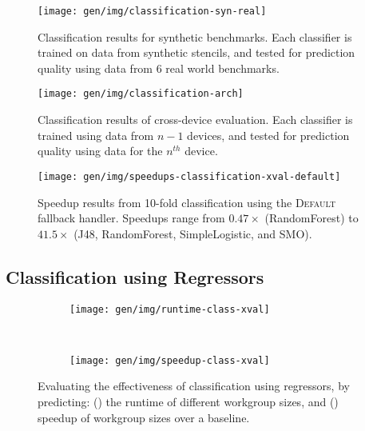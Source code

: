 

\cleardoublepage
\begin{figure}
\centering
\texttt{[image: gen/img/classification-syn-real]}
\caption{%
  Classification results for synthetic benchmarks. Each classifier is
  trained on data from synthetic stencils, and tested for prediction
  quality using data from 6 real world benchmarks.%
}
\end{figure}
\newpage
\begin{figure}
\centering
\texttt{[image: gen/img/classification-arch]}
\caption{%
  Classification results of cross-device evaluation. Each classifier
  is trained using data from $n-1$ devices, and tested for prediction
  quality using data for the $n^{th}$ device.%
}
\end{figure}

\begin{figure}
\centering
\texttt{[image: gen/img/speedups-classification-xval-default]}
\caption{%
  Speedup results from 10-fold classification using the
  \textsc{Default} fallback handler. Speedups range from $0.47\times$
  (RandomForest) to $41.5\times$ (J48, RandomForest, SimpleLogistic,
  and SMO).%
}
\end{figure}

\subsection{Classification using Regressors}

\begin{figure}
\centering
\begin{subfigure}[h]{.45\textwidth}
\centering
\texttt{[image: gen/img/runtime-class-xval]}
\caption{}
\label{fig:runtime-class-xval}
\end{subfigure}
~%
\begin{subfigure}[h]{.45\textwidth}
\centering
\texttt{[image: gen/img/speedup-class-xval]}
\caption{}
\label{fig:speedup-class-xval}
\end{subfigure}
\caption{%
  Evaluating the effectiveness of classification using regressors, by
  predicting: () the runtime of
  different workgroup sizes, and ()
  speedup of workgroup sizes over a baseline.%
}
\label{fig:regression-class}
\end{figure}

